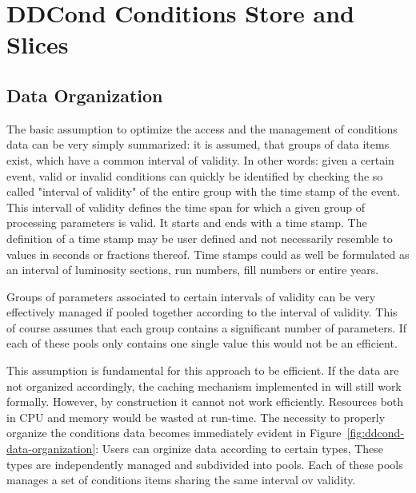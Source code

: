 \documentclass[10pt,a4paper]{article}
\begin{document}
\newpage
\section{DDCond Conditions Store and Slices}
\label{subsec:ddcond-conditions-store}

\subsection{Data Organization}
\label{subsec:ddcond-internal-data-organization}

\noindent
The basic assumption to optimize the access and the management of conditions
data can be very simply summarized: it is assumed, that groups of data items
exist, which have a common interval of validity. In other words: given a 
certain event, valid or invalid conditions can quickly be identified by 
checking the so called "interval of validity" of the entire group with the
time stamp of the event. This intervall of validity defines the time span
for which a given group of processing parameters is valid. It starts and 
ends with a time stamp. The definition of a time stamp may be user defined 
and not necessarily resemble to values in seconds or fractions thereof. 
Time stamps could as well be formulated as an interval of luminosity sections,
run numbers, fill numbers or entire years. 

\noindent
Groups of parameters associated to certain intervals of validity can
be very effectively managed if pooled together according to the 
interval of validity. This of course assumes that each group contains
a significant number of parameters. If each of these pools only contains
one single value this would not be an efficient.

\noindent
This assumption is fundamental for this approach to be efficient. 
If the data are not
organized accordingly, the caching mechanism implemented in \DDC will 
still work formally. However, by construction it cannot not work efficiently. 
Resources both in CPU and memory would be wasted at run-time.
The necessity to properly organize the conditions data becomes
immediately evident in Figure~\ref{fig:ddcond-data-organization}:
Users can orginize data according to certain types, These types are
independently managed and subdivided into pools. Each of these pools
manages a set of conditions items sharing the same interval ov validity.
\end{document}
